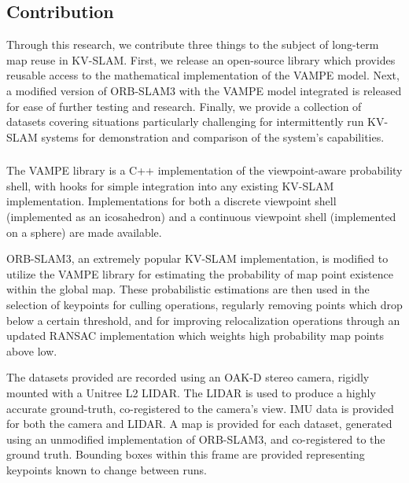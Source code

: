 \subsection{Contribution}

Through this research, we contribute three things to the subject of long-term map reuse in KV-SLAM. First, we release an open-source library which provides reusable access to the mathematical implementation of the VAMPE model. Next, a modified version of ORB-SLAM3 with the VAMPE model integrated is released for ease of further testing and research. Finally, we provide a collection of datasets covering situations particularly challenging for intermittently run KV-SLAM systems for demonstration and comparison of the system's capabilities.

\subsubsection{}
The VAMPE library is a C++ implementation of the viewpoint-aware probability shell, with hooks for simple integration into any existing KV-SLAM implementation. Implementations for both a discrete viewpoint shell (implemented as an icosahedron) and a continuous viewpoint shell (implemented on a sphere) are made available.


ORB-SLAM3, an extremely popular KV-SLAM implementation, is modified to utilize the VAMPE library for estimating the probability of map point existence within the global map. These probabilistic estimations are then used in the selection of keypoints for culling operations, regularly removing points which drop below a certain threshold, and for improving relocalization operations through an updated RANSAC implementation which weights high probability map points above low.


The datasets provided are recorded using an OAK-D stereo camera, rigidly mounted with a Unitree L2 LIDAR. The LIDAR is used to produce a highly accurate ground-truth, co-registered to the camera's view. IMU data is provided for both the camera and LIDAR. A map is provided for each dataset, generated using an unmodified implementation of ORB-SLAM3, and co-registered to the ground truth. Bounding boxes within this frame are provided representing keypoints known to change between runs.